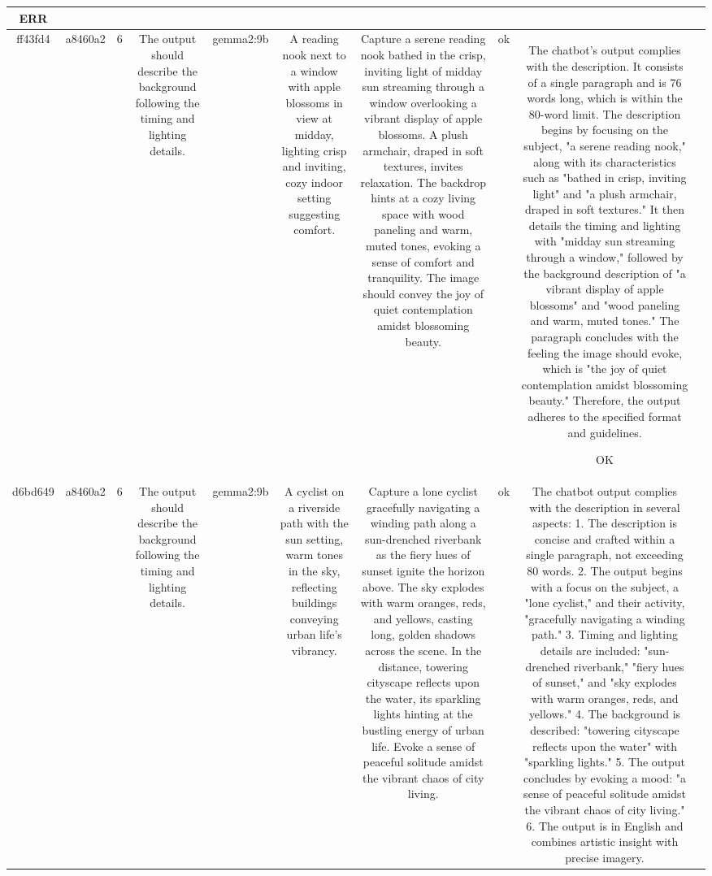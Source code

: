 \begin{table}[h!]
\begin{tabular}{|c|c|c|c|c|c|c|c|c|c|}
ERR & \\
\hline
ff43fd4 & a8460a2 & 6 & The output should describe the background following the timing and lighting details. & gemma2:9b & A reading nook next to a window with apple blossoms in view at midday, lighting crisp and inviting, cozy indoor setting suggesting comfort. & Capture a serene reading nook bathed in the crisp, inviting light of midday sun streaming through a window overlooking a vibrant  display of apple blossoms. A plush armchair, draped in soft textures, invites relaxation. The backdrop hints at a cozy living space with wood paneling and warm, muted tones, evoking a sense of comfort and tranquility.  The image should convey the joy of quiet contemplation amidst blossoming beauty.   
 & ok & The chatbot's output complies with the description. It consists of a single paragraph and is 76 words long, which is within the 80-word limit. The description begins by focusing on the subject, "a serene reading nook," along with its characteristics such as "bathed in crisp, inviting light" and "a plush armchair, draped in soft textures." It then details the timing and lighting with "midday sun streaming through a window," followed by the background description of "a vibrant display of apple blossoms" and "wood paneling and warm, muted tones." The paragraph concludes with the feeling the image should evoke, which is "the joy of quiet contemplation amidst blossoming beauty." Therefore, the output adheres to the specified format and guidelines.

OK & \\
\hline
d6bd649 & a8460a2 & 6 & The output should describe the background following the timing and lighting details. & gemma2:9b & A cyclist on a riverside path with the sun setting, warm tones in the sky, reflecting buildings conveying urban life’s vibrancy. & Capture a lone cyclist gracefully navigating a winding path along a sun-drenched riverbank as the fiery hues of sunset ignite the horizon above.  The sky explodes with warm oranges, reds, and yellows, casting long, golden shadows across the scene. In the distance, towering cityscape reflects upon the water, its sparkling lights hinting at the bustling energy of urban life. Evoke a sense of peaceful solitude amidst the vibrant chaos of city living. 


 & ok & The chatbot output complies with the description in several aspects:
1. The description is concise and crafted within a single paragraph, not exceeding 80 words.
2. The output begins with a focus on the subject, a "lone cyclist," and their activity, "gracefully navigating a winding path."
3. Timing and lighting details are included: "sun-drenched riverbank," "fiery hues of sunset," and "sky explodes with warm oranges, reds, and yellows."
4. The background is described: "towering cityscape reflects upon the water" with "sparkling lights."
5. The output concludes by evoking a mood: "a sense of peaceful solitude amidst the vibrant chaos of city living."
6. The output is in English and combines artistic insight with precise imagery.


\end{tabular}
\end{table}
